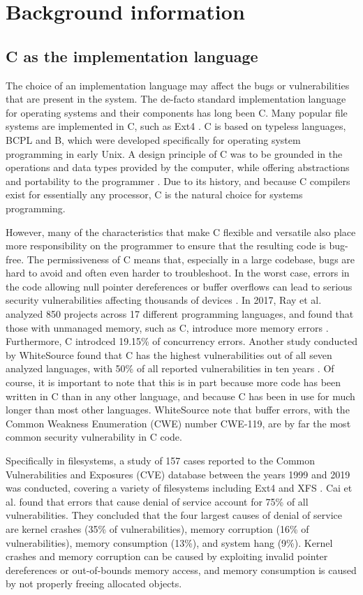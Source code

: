 \section{Background information}
\subsection{C as the implementation language}
The choice of an implementation language may affect the bugs or vulnerabilities that are present in the system.
The de-facto standard implementation language for operating systems and their components has long been C.
Many popular file systems are implemented in C, such as Ext4 \cite{ext4source}.
C is based on typeless languages, BCPL and B, which were developed specifically for operating system programming in early Unix.
A design principle of C was to be grounded in the operations and data types provided by the computer, while offering abstractions and portability to the programmer \cite{ritchie1993}.
Due to its history, and because C compilers exist for essentially any processor, C is the natural choice for systems programming.

However, many of the characteristics that make C flexible and versatile also place more responsibility on the programmer to ensure that the resulting code is bug-free.
The permissiveness of C means that, especially in a large codebase, bugs are hard to avoid and often even harder to troubleshoot.
In the worst case, errors in the code allowing null pointer dereferences or buffer overflows can lead to serious security vulnerabilities affecting thousands of devices \cite{cert2001}.
In 2017, Ray et al. analyzed 850 projects across 17 different programming languages, and found that those with unmanaged memory, such as C, introduce more memory errors \cite{ray2017}.
Furthermore, C introdced 19.15\% of concurrency errors.
Another study conducted by WhiteSource found that C has the highest vulnerabilities out of all seven analyzed languages, with 50\% of all reported vulnerabilities in ten years \cite{whitesource2019}.
Of course, it is important to note that this is in part because more code has been written in C than in any other language, and because C has been in use for much longer than most other languages.
WhiteSource note that buffer errors, with the Common Weakness Enumeration (CWE) number CWE-119, are by far the most common security vulnerability in C code.

Specifically in filesystems, a study of 157 cases reported to the Common Vulnerabilities and Exposures (CVE) database between the years 1999 and 2019 was conducted, covering a variety of filesystems including Ext4 and XFS \cite{cai2019}.
Cai et al. found that errors that cause denial of service account for 75\% of all vulnerabilities.
They concluded that the four largest causes of denial of service are kernel crashes (35\% of vulnerabilities), memory corruption (16\% of vulnerabilities), memory consumption (13\%), and system hang (9\%).
Kernel crashes and memory corruption can be caused by exploiting invalid pointer dereferences or out-of-bounds memory access, and memory consumption is caused by not properly freeing allocated objects.

